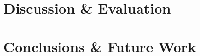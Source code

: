 \documentclass[a4paper, 11pt]{report}
\begin{document}
    \newpage
    \chapter{Discussion \& Evaluation}
    \label{chapter: evaluation}

    \newpage
    \chapter{Conclusions \& Future Work}
    \label{chapter: conclusion}



    \newpage
    
\end{document}
